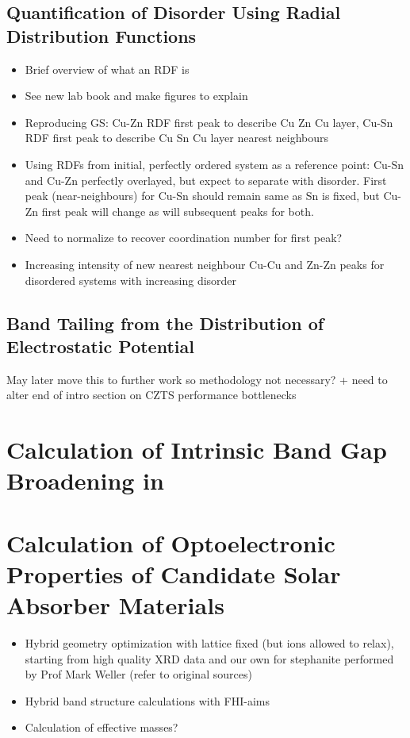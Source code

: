\subsection{Quantification of Disorder Using Radial Distribution Functions}\label{RDF_methods}
\begin{itemize}
\item Brief overview of what an RDF is
\item See new lab book and make figures to explain
\item Reproducing GS: Cu-Zn RDF first peak to describe Cu Zn Cu layer, Cu-Sn RDF first peak to describe Cu Sn Cu layer nearest neighbours
\item Using RDFs from initial, perfectly ordered system as a reference point: Cu-Sn and Cu-Zn perfectly overlayed, but expect to separate with disorder. First peak (near-neighbours) for Cu-Sn should remain same as Sn is fixed, but Cu-Zn first peak will change as will subsequent peaks for both.
\item Need to normalize to recover coordination number for first peak?
\item Increasing intensity of new nearest neighbour Cu-Cu and Zn-Zn peaks for disordered systems with increasing disorder
\end{itemize}


\subsection{Band Tailing from the Distribution of Electrostatic Potential}
May later move this to further work so methodology not necessary? + need to alter end of intro section on CZTS performance bottlenecks




\section{Calculation of Intrinsic Band Gap Broadening in \CZTS}


\section{Calculation of Optoelectronic Properties of Candidate Solar Absorber Materials}\label{properties_methods}
\begin{itemize}
\item Hybrid geometry optimization with lattice fixed (but ions allowed to relax), starting from high quality XRD data and our own for stephanite performed by Prof Mark Weller (refer to original sources)
\item Hybrid band structure calculations with FHI-aims
\item Calculation of effective masses?
\end{itemize}

                            